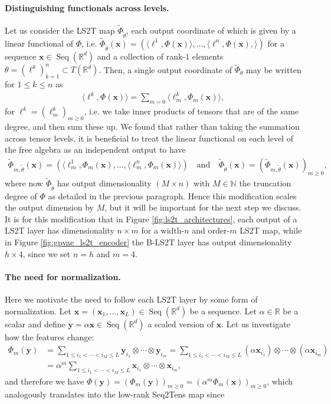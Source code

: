 \documentclass{article} \usepackage{iclr2021_conference,times}
\newcommand{\R}{\mathbb{R}}
\newcommand{\bx}{\mathbf{x}}
\newcommand{\by}{\mathbf{y}}
\newcommand{\NN}{\mathbb{N}}
\newcommand{\Seq}[1]{\operatorname{Seq}(#1)}
\theoremstyle{plain}
\theoremstyle{definition}
\begin{document}
\paragraph{Distinguishing functionals across levels.} Let us consider the LS2T map $\tilde\Phi_{\tilde\theta}$, each output coordinate of which is given by a linear functional of $\Phi$, i.e. $\tilde\Phi_{\tilde\theta}(\bx) = \left(\langle \ell^1, \Phi(\bx) \rangle, \dots, \langle \ell^n, \Phi(\bx), \rangle\right)$ for a sequence $\bx \in \Seq{\R^d}$ and a collection of rank-$1$ elements $\theta = (\ell^k)_{k=1}^n \subset T(\R^d)$. Then, a single output coordinate of $\tilde\Phi_{\theta}$ may be written for $1 \leq k \leq n$ as
\begin{align}
\langle \ell^k, \Phi(\bx) \rangle = \sum_{m=0} \langle \ell^k_m, \Phi_m(\bx) \rangle,
\end{align}
for $\ell^k = (\ell^k_m)_{m \geq 0}$, i.e. we take inner products of tensors that are of the same degree, and then sum these up. We found that rather than taking the summation across tensor levels, it is beneficial to treat the linear functional on each level of the free algebra as an independent output to have
\begin{align}
    \tilde\Phi_{m, \tilde\theta}(\bx) = (\langle \ell^1_m, \Phi_m(\bx), \dots, \langle \ell^n_m, \Phi_m(\bx) \rangle) \quad\text{and}\quad \tilde\Phi_{\tilde\theta}(\bx) = (\tilde\Phi_{m, \tilde\theta}(\bx))_{m \geq 0}, 
\end{align}
where now $\tilde\Phi_{\tilde\theta}$ has output dimensionality $(M \times n)$ with $M \in \NN$ the truncation degree of $\Phi$ as detailed in the previous paragraph. Hence this modification scales the output dimension by $M$, but it will be important for the next step we discuss. It is for this modification that in Figure \ref{fig:ls2t_architectures}, each output of a LS2T layer has dimensionality $n \times m$ for a width-$n$ and order-$m$ LS2T map, while in Figure \ref{fig:gpvae_ls2t_encoder} the B-LS2T layer has output dimensionality $h \times 4$, since we set $n=h$ and $m=4$.

\paragraph{The need for normalization.}
Here we motivate the need to follow each LS2T layer by some form of normalization. Let $\bx = (\bx_1, \dots, \bx_L) \in \Seq{\R^d}$ be a sequence. Let $\alpha \in \R$ be a scalar and define $\by = \alpha \bx \in \Seq{\R^d}$ a scaled version of $\bx$. Let us investigate how the features change:
\begin{align}
    \Phi_m(\by) &= \sum_{1 \leq i_1 < \cdots < i_M \leq L} \by_{i_1} \otimes \cdots \otimes \by_{i_m} 
    = \sum_{1 \leq i_1 < \cdots < i_M \leq L} (\alpha \bx_{i_1}) \otimes \cdots \otimes (\alpha \bx_{i_m}) \\
    &=  \alpha^m \sum_{1 \leq i_1 < \cdots < i_M \leq L} \bx_{i_1} \otimes \cdots \otimes \bx_{i_m},
\end{align}
and therefore we have $\Phi(\by) = (\Phi_m(\by))_{m \geq 0} = (\alpha^m \Phi_m(\bx))_{m \geq 0}$, which analogously translates into the low-rank Seq2Tens map since
\end{document}
